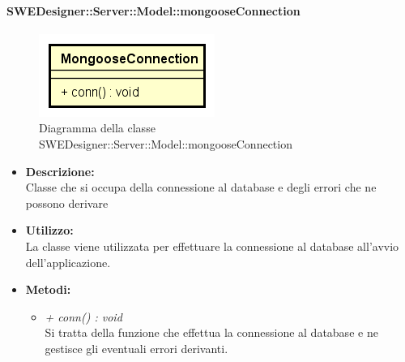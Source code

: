       \paragraph{SWEDesigner::Server::Model::mongooseConnection}
      	\begin{figure}[h!]
		\centering
		\includegraphics[scale=0.8]{Classi/MongooseConnection.png}
		\caption{Diagramma della classe SWEDesigner::Server::Model::mongooseConnection}
 		\end{figure}
        \begin{itemize}
          \item \textbf{Descrizione: }\\
          Classe che si occupa della connessione al database e degli errori che ne possono derivare
          \item \textbf{Utilizzo: }\\
          La classe viene utilizzata per effettuare la connessione al database all'avvio dell'applicazione.
          \item \textbf{Metodi: }\\
          \begin{itemize}
            \item \emph{+ conn() : void}\\
            Si tratta della funzione che effettua la connessione al database e ne gestisce gli eventuali errori derivanti.
          \end{itemize}
        \end{itemize}
